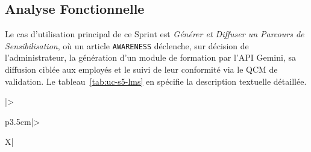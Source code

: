 \subsection{Analyse Fonctionnelle}
Le cas d'utilisation principal de ce Sprint est \textit{Générer et Diffuser un Parcours de Sensibilisation}, où un article \texttt{AWARENESS} déclenche, sur décision de l'administrateur, la génération d'un module de formation par l'\ac{API} Gemini, sa diffusion ciblée aux employés et le suivi de leur conformité via le \ac{QCM} de validation. Le tableau~\ref{tab:uc-s5-lms} en spécifie la description textuelle détaillée.

\begingroup
\renewcommand{\arraystretch}{1.25}
\small
\begin{xltabular}{\textwidth}{|>{\bfseries\raggedright\arraybackslash}p{3.5cm}|>{\raggedright\arraybackslash}X|}

\caption{Description textuelle du cas d'utilisation « Générer et diffuser un parcours de sensibilisation ».}
\label{tab:uc-s5-lms} \\

\hline
\endfirsthead

\hline
{} \\
\endfoot

\endlastfoot


\end{xltabular}
